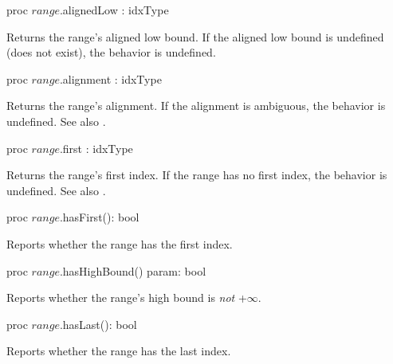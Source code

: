 \begin{protohead}
proc $range$.alignedLow : idxType
\end{protohead}
\begin{protobody}
Returns the range's aligned low bound.
If the aligned low bound is undefined (does not exist),
the behavior is undefined.
\end{protobody}

\begin{protohead}
proc $range$.alignment : idxType
\end{protohead}
\begin{protobody}
Returns the range's alignment.
If the alignment is ambiguous, the behavior is undefined.
See also .
\end{protobody}

\begin{protohead}
proc $range$.first : idxType
\end{protohead}
\begin{protobody}
Returns the range's first index.
If the range has no first index, the behavior is undefined.
See also .
\end{protobody}

\begin{protohead}
proc $range$.hasFirst(): bool
\end{protohead}
\begin{protobody}
Reports whether the range has the first index.
\end{protobody}

\begin{protohead}
proc $range$.hasHighBound() param: bool
\end{protohead}
\begin{protobody}
Reports whether the range's high bound is \emph{not} +$\infty$.
\end{protobody}

\begin{protohead}
proc $range$.hasLast(): bool
\end{protohead}
\begin{protobody}
Reports whether the range has the last index.
\end{protobody}

